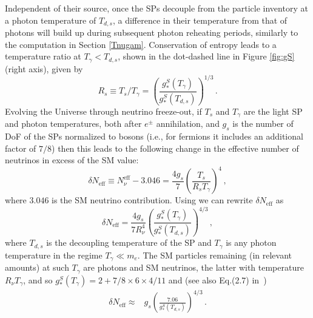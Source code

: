 Independent of their source, once the SPs decouple from the  particle inventory at a photon temperature of $T_{d,s}$, a difference in their temperature from that of photons will build up during subsequent photon reheating periods, similarly to the computation in Section \ref{Tnugam}. Conservation of entropy leads to a temperature ratio at $T_\gamma<T_{d,s}$, shown in the dot-dashed line in Figure \ref{fig:gS} (right axis), given by
\begin{equation}\label{T_ratio}
R_s\equiv T_{s}/T_{\gamma}=\left(\frac{g_*^S(T_\gamma)}{g_*^S(T_{d,s})}\right)^{1/3}\,.
\end{equation}
Evolving the Universe through neutrino freeze-out, if $T_s$ and $T_\gamma$ are the light SP and photon temperatures, both after $e^\pm$ annihilation, and $g_s$ is the number of DoF of the SPs normalized to bosons (i.e., for fermions it includes an additional factor of $7/8$) then this leads to the following change in the effective number of neutrinos in excess of the SM value:
\begin{equation}\label{Neff1}
\delta N_{\text{eff}}\equiv N^{\text{eff}}_{\nu}-3.046=\frac{4g_s}{7}\left(\frac{T_s}{R_s T_{\gamma}}\right)^4\,,
\end{equation}
where $3.046$ is the SM neutrino contribution. Using  we can rewrite $\delta N_{\text{eff}}$ as
\begin{equation}\label{delta_N}
\delta N_{\text{eff}}=\frac{4g_s}{7R_\nu^4}\left(\frac{g_*^S(T_{\gamma})}{g_*^S(T_{d,s})}\right)^{4/3}\,,
\end{equation}
where   $T_{d,s}$ is the decoupling temperature of the SP and $T_{\gamma}$ is any photon temperature in the regime $T_{\gamma}\ll m_e$. The SM particles remaining (in relevant amounts) at such $T_{\gamma}$ are  photons and SM neutrinos, the latter with temperature $R_\nu T_{\gamma}$, and so $g_*^S(T_{\gamma})=2+7/8\times 6\times 4/11$ and (see also Eq.(2.7) in~\cite{Blennow:2012de})
\begin{align}\label{delta_N2}
\delta N_{\text{eff}}\approx&g_s\left(\frac{7.06}{g_*^S(T_{d,s})}\right)^{4/3}\,.
\end{align}

